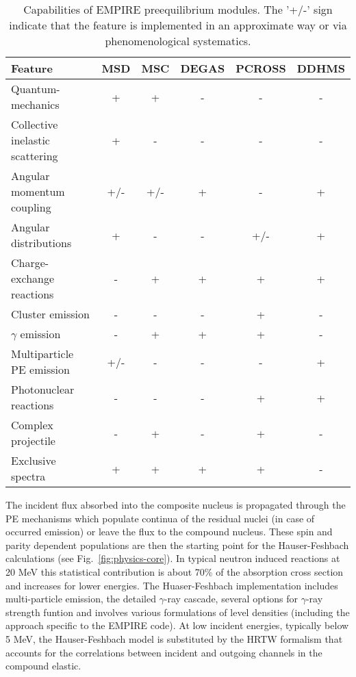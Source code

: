 \documentclass[twocolumn,amsmath,amssymb,10pt,groupedaddress,letter]{revtex4}
\begin{document}
\begin{table*}
\caption{\label{tbl:PEcapabilities}Capabilities of EMPIRE preequilibrium modules. The '+/-' sign indicate that the feature is implemented in an approximate way or via phenomenological systematics.}
\begin{tabular}{lccccc}
   \hline
\textbf{Feature}                  &\textbf{MSD }&\textbf{ MSC }&\textbf{ DEGAS }&\textbf{ PCROSS }&\textbf{ DDHMS }   \\
\hline
Quantum-mechanics                &     +     &    +    &     -     &      -     &     -     \\
Collective inelastic scattering   &     +     &    -    &     -     &      -     &     -     \\
Angular momentum coupling         &    +/-    &   +/-   &     +     &      -     &     +     \\
Angular distributions             &     +     &    -    &     -     &     +/-    &     +     \\
Charge-exchange reactions         &     -     &    +    &     +     &      +     &     +     \\
Cluster emission                  &     -     &    -    &     -     &      +     &     -     \\
$\gamma$ emission                 &     -     &    +    &     +     &      +     &     -     \\
Multiparticle PE emission         &    +/-    &    -    &     -     &      -     &     +     \\
Photonuclear reactions            &     -     &    -    &     -     &      +     &     +     \\
Complex projectile                &     -     &    +    &     -     &      +     &     -     \\
Exclusive spectra                 &     +     &    +    &     +     &      +     &     -     \\
\hline
\end{tabular}
\end{table*}

The incident flux absorbed into the composite nucleus is propagated through the PE mechanisms which populate continua of the residual nuclei (in case of occurred emission) or leave the flux to the compound nucleus. These spin and parity dependent populations  are then the starting point for the Hauser-Feshbach calculations (see Fig.~\ref{fig:physics-core}). In typical neutron induced reactions at 20 MeV this statistical contribution is  about 70\% of the  absorption cross section and increases for lower energies. The Huaser-Feshbach implementation includes multi-particle emission, the detailed $\gamma$-ray cascade, several options for $\gamma$-ray strength funtion and involves various formulations of level densities (including the approach specific to the EMPIRE code). At low incident energies, typically below 5 MeV, the Hauser-Feshbach model is substituted by the HRTW formalism that accounts for the correlations between incident and outgoing channels in the compound elastic.
\end{document}
